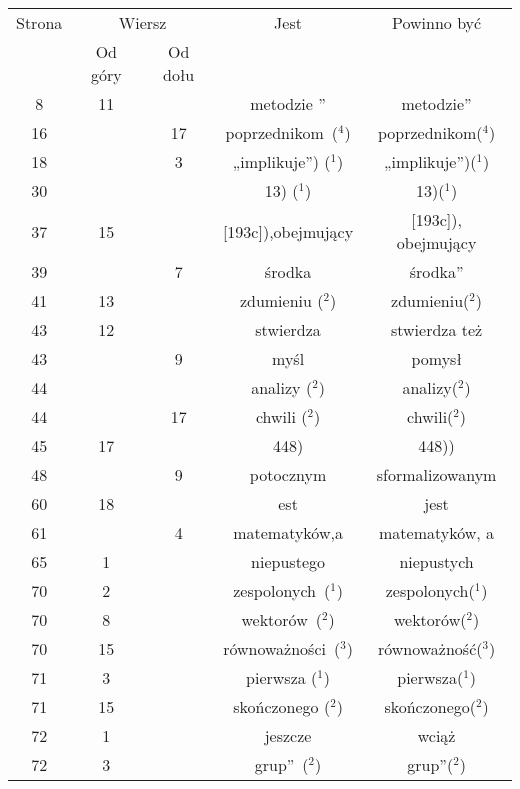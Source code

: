 \documentclass[a4paper,11pt]{article}
\numberwithin{equation}{section}
\begin{document}
\begin{center}

  \begin{tabular}{|c|c|c|c|c|}
    \hline
    Strona & \multicolumn{2}{c|}{Wiersz} & Jest
                              & Powinno być \\ \cline{2-3}
    & Od góry & Od dołu & & \\
    \hline
    \hphantom{0}8 & 11 & & metodzie ” & metodzie” \\
    16 & & 17 & poprzednikom~($^{ 4 }$) & poprzednikom($^{ 4 }$) \\
    18 & & \hphantom{0}3 & „implikuje”) ($^{ 1 }$) & „implikuje”)($^{ 1 }$) \\
    30 & & & 13) ($^{ 1 }$) & 13)($^{ 1 }$) \\
    37 & 15 & & [193c]),obejmujący & [193c]), obejmujący \\
    39 & & \hphantom{0}7 & środka & środka” \\
    41 & 13 & & zdumieniu ($^{ 2 }$) & zdumieniu($^{ 2 }$) \\
    43 & 12 & & stwierdza & stwierdza też \\
    43 & & \hphantom{0}9 & myśl & pomysł \\
    44 & & & analizy ($^{ 2 }$) & analizy($^{ 2 }$) \\
    44 & & 17 & chwili ($^{ 2 }$) & chwili($^{ 2 }$) \\
    45 & 17 & & 448) & 448)) \\
    48 & & \hphantom{0}9 & potocznym & sformalizowanym \\
    60 & 18 & & est & jest \\
    61 & & \hphantom{0}4 & matematyków,a & matematyków, a \\
    65 & \hphantom{0}1 & & niepustego & niepustych \\
    70 & \hphantom{0}2 & & zespolonych~($^{ 1 }$) & zespolonych($^{ 1 }$) \\
    70 & \hphantom{0}8 & & wektorów~($^{ 2 }$) & wektorów($^{ 2 }$) \\
    70 & 15 & & równoważności~($^{ 3 }$) & równoważność($^{ 3 }$) \\
    71 & \hphantom{0}3 & & pierwsza ($^{ 1 }$) & pierwsza($^{ 1 }$) \\
    71 & 15 & & skończonego ($^{ 2 }$) & skończonego($^{ 2 }$) \\
    72 & \hphantom{0}1 & & jeszcze & wciąż \\
    72 & \hphantom{0}3 & & grup”~($^{ 2 }$) & grup”($^{ 2 }$) \\

\end{tabular}
\end{center}
\end{document}
